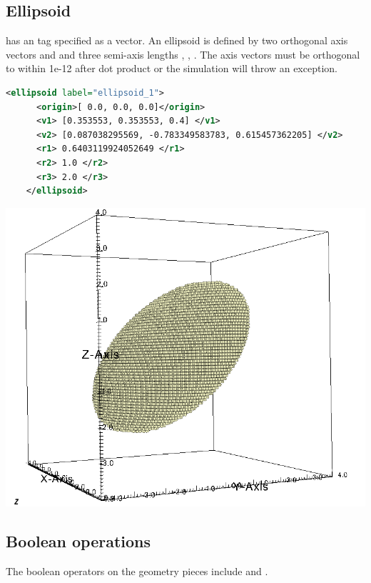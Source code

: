 \subsection{Ellipsoid}
\begin{minipage}{0.6\textwidth}
   has an  tag specified as a vector.  
  An ellipsoid is defined by two orthogonal axis vectors  and
   and three semi-axis lengths , , .
  The axis vectors must be orthogonal to within 1e-12 after dot product or 
  the simulation will throw an exception.  
  \begin{lstlisting}[language=XML]
    <ellipsoid label="ellipsoid_1">
      <origin>[ 0.0, 0.0, 0.0]</origin>
      <v1> [0.353553, 0.353553, 0.4] </v1>
      <v2> [0.087038295569, -0.783349583783, 0.615457362205] </v2>
      <r1> 0.6403119924052649 </r1>
      <r2> 1.0 </r2>
      <r3> 2.0 </r3>
    </ellipsoid>
  \end{lstlisting}
\end{minipage}
\begin{minipage}{0.4\textwidth}
  \centering
  \includegraphics[width=0.9\columnwidth]{FIGS/geometry/geom_ellipsoid.png}
\end{minipage}

\subsection{Boolean operations}
The boolean operators on the geometry pieces include  and .

